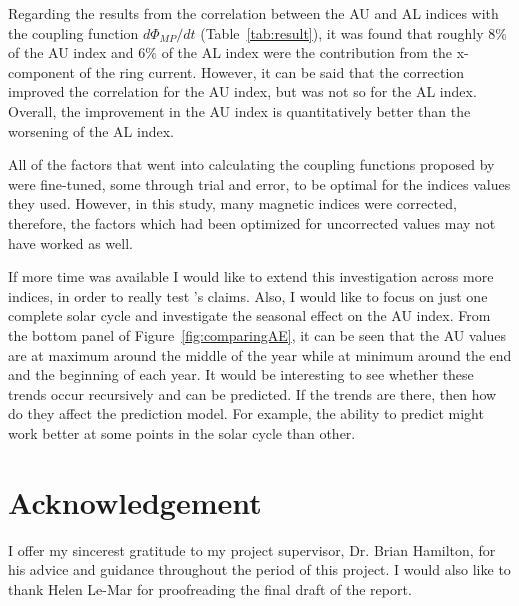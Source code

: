 \documentclass[12pt]{report} %
\begin{document}
Regarding the results from the correlation between the AU and AL indices with the coupling function $d\Phi_{MP}/dt$ (Table~\ref{tab:result}), it was found that roughly $8\%$ of the AU index and $6\%$ of the AL index were the contribution from the x-component of the ring current. However, it can be said that the correction improved the correlation for the AU index, but was not so for the AL index. Overall, the improvement in the AU index is quantitatively better than the worsening of the AL index. 

All of the factors that went into calculating the coupling functions proposed by \cite{newell07} were fine-tuned, some through trial and error, to be optimal for the indices values they used. However, in this study, many magnetic indices were corrected, therefore, the factors which had been optimized for uncorrected values may not have worked as well. 

If more time was available I would like to extend this investigation across more indices, in order to really test \cite{newell07}'s claims. Also, I would like to focus on just one complete solar cycle and investigate the seasonal effect on the AU index. From the bottom panel of Figure~\ref{fig:comparingAE}, it can be seen that the AU values are at maximum around the middle of the year while at minimum around the end and the beginning of each year. It would be interesting to see whether these trends occur recursively and can be predicted. If the trends are there, then how do they affect the prediction model. For example, the ability to predict might work better at some points in the solar cycle than other.


\section*{Acknowledgement}
I offer my sincerest gratitude to my project supervisor, Dr. Brian Hamilton, for his advice and guidance throughout the period of this project. I would also like to thank Helen Le-Mar for proofreading the final draft of the report.
\end{document}
